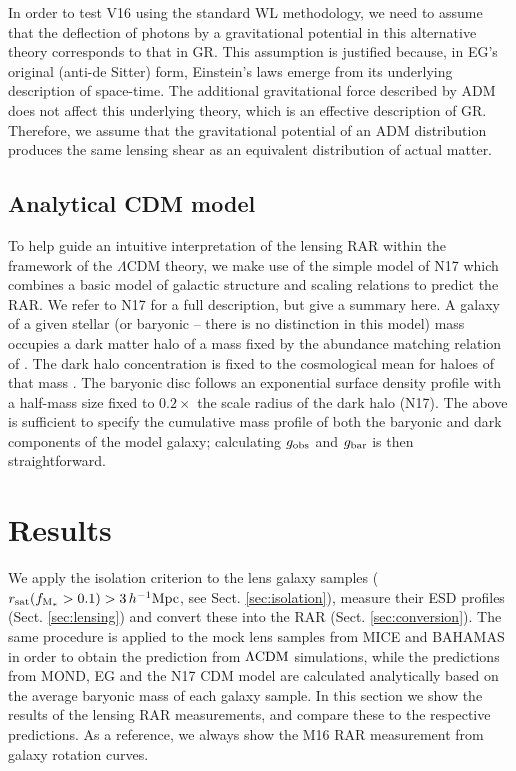 \documentclass[usenatbib]{mnras}
\newcommand{\hMpc}{\, h^{-1}{\rm{Mpc}} }
\newcommand{\lcdm}{{\rm \Lambda CDM}}
\newcommand{\un}[1]{_{\rm #1}}
\begin{document}
In order to test V16 using the standard WL methodology, we need to assume that the deflection of photons by a gravitational potential in this alternative theory corresponds to that in GR. This assumption is justified because, in EG's original (anti-de Sitter) form, Einstein's laws emerge from its underlying description of space-time. The additional gravitational force described by ADM does not affect this underlying theory, which is an effective description of GR. Therefore, we assume that the gravitational potential of an ADM distribution produces the same lensing shear as an equivalent distribution of actual matter.

\subsection{Analytical CDM model}
\label{sec:analytical}

To help guide an intuitive interpretation of the lensing RAR within the framework of the $\Lambda$CDM theory, we make use of the simple model of N17 which combines a basic model of galactic structure and scaling relations to predict the RAR. We refer to N17 for a full description, but give a summary here. A galaxy of a given stellar (or baryonic -- there is no distinction in this model)  mass occupies a dark matter halo of a mass fixed by the abundance matching relation of \citet{Behroozi13}. The dark halo concentration is fixed to the cosmological mean for haloes of that mass \citep{Ludlow14}. The baryonic disc follows an exponential surface density profile with a half-mass size fixed to $0.2\times$ the scale radius of the dark halo (N17). The above is sufficient to specify the cumulative mass profile of both the baryonic and dark components of the model galaxy; calculating $g_{\rm obs}$ and $g_{\rm bar}$ is then straightforward.

\section{Results}
\label{sec:results}

We apply the isolation criterion to the lens galaxy samples (\mbox{$r\un{sat}(f\un{M_*}>0.1)>3\hMpc$}, see Sect. \ref{sec:isolation}), measure their ESD profiles (Sect. \ref{sec:lensing}) and convert these into the RAR (Sect. \ref{sec:conversion}). The same procedure is applied to the mock lens samples from MICE and BAHAMAS in order to obtain the prediction from $\lcdm$ simulations, while the predictions from MOND, EG and the N17 CDM model are calculated analytically based on the average baryonic mass of each galaxy sample. In this section we show the results of the lensing RAR measurements, and compare these to the respective predictions. As a reference, we always show the M16 RAR measurement from galaxy rotation curves.
\end{document}
